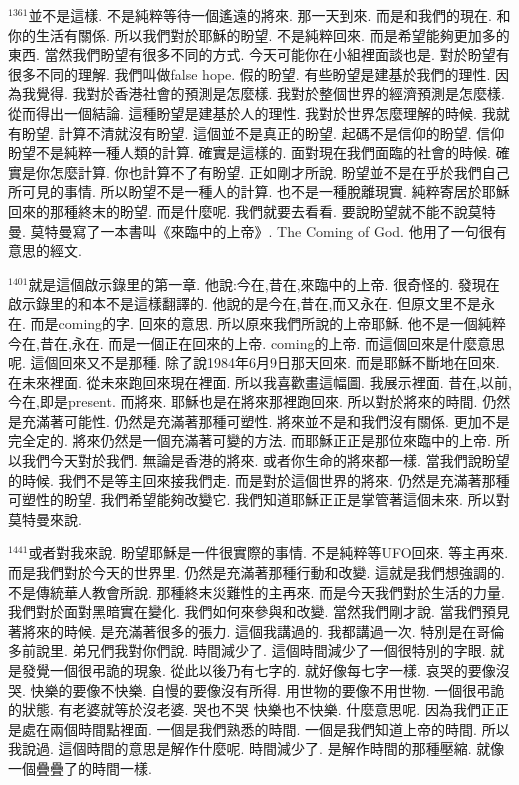\documentclass{book}
\begin{document}
$^{1361}$並不是這樣.
不是純粹等待一個遙遠的將來.
那一天到來.
而是和我們的現在.
和你的生活有關係.
所以我們對於耶穌的盼望.
不是純粹回來.
而是希望能夠更加多的東西.
當然我們盼望有很多不同的方式.
今天可能你在小組裡面談也是.
對於盼望有很多不同的理解.
我們叫做false hope.
假的盼望.
有些盼望是建基於我們的理性.
因為我覺得.
我對於香港社會的預測是怎麼樣.
我對於整個世界的經濟預測是怎麼樣.
從而得出一個結論.
這種盼望是建基於人的理性.
我對於世界怎麼理解的時候.
我就有盼望.
計算不清就沒有盼望.
這個並不是真正的盼望.
起碼不是信仰的盼望.
信仰盼望不是純粹一種人類的計算.
確實是這樣的.
面對現在我們面臨的社會的時候.
確實是你怎麼計算.
你也計算不了有盼望.
正如剛才所說.
盼望並不是在乎於我們自己所可見的事情.
所以盼望不是一種人的計算.
也不是一種脫離現實.
純粹寄居於耶穌回來的那種終末的盼望.
而是什麼呢.
我們就要去看看.
要說盼望就不能不說莫特曼.
莫特曼寫了一本書叫《來臨中的上帝》.
The Coming of God.
他用了一句很有意思的經文.

$^{1401}$就是這個啟示錄里的第一章.
他說:今在,昔在,來臨中的上帝.
很奇怪的.
發現在啟示錄里的和本不是這樣翻譯的.
他說的是今在,昔在,而又永在.
但原文里不是永在.
而是coming的字.
回來的意思.
所以原來我們所說的上帝耶穌.
他不是一個純粹今在,昔在,永在.
而是一個正在回來的上帝.
coming的上帝.
而這個回來是什麼意思呢.
這個回來又不是那種.
除了說1984年6月9日那天回來.
而是耶穌不斷地在回來.
在未來裡面.
從未來跑回來現在裡面.
所以我喜歡畫這幅圖.
我展示裡面.
昔在,以前,今在,即是present.
而將來.
耶穌也是在將來那裡跑回來.
所以對於將來的時間.
仍然是充滿著可能性.
仍然是充滿著那種可塑性.
將來並不是和我們沒有關係.
更加不是完全定的.
將來仍然是一個充滿著可變的方法.
而耶穌正正是那位來臨中的上帝.
所以我們今天對於我們.
無論是香港的將來.
或者你生命的將來都一樣.
當我們說盼望的時候.
我們不是等主回來接我們走.
而是對於這個世界的將來.
仍然是充滿著那種可塑性的盼望.
我們希望能夠改變它.
我們知道耶穌正正是掌管著這個未來.
所以對莫特曼來說.

$^{1441}$或者對我來說.
盼望耶穌是一件很實際的事情.
不是純粹等UFO回來.
等主再來.
而是我們對於今天的世界里.
仍然是充滿著那種行動和改變.
這就是我們想強調的.
不是傳統華人教會所說.
那種終末災難性的主再來.
而是今天我們對於生活的力量.
我們對於面對黑暗實在變化.
我們如何來參與和改變.
當然我們剛才說.
當我們預見著將來的時候.
是充滿著很多的張力.
這個我講過的.
我都講過一次.
特別是在哥倫多前說里.
弟兄們我對你們說.
時間減少了.
這個時間減少了一個很特別的字眼.
就是發覺一個很弔詭的現象.
從此以後乃有七字的.
就好像每七字一樣.
哀哭的要像沒哭.
快樂的要像不快樂.
自慢的要像沒有所得.
用世物的要像不用世物.
一個很弔詭的狀態.
有老婆就等於沒老婆.
哭也不哭 快樂也不快樂.
什麼意思呢.
因為我們正正是處在兩個時間點裡面.
一個是我們熟悉的時間.
一個是我們知道上帝的時間.
所以我說過.
這個時間的意思是解作什麼呢.
時間減少了.
是解作時間的那種壓縮.
就像一個疊疊了的時間一樣.
\end{document}

